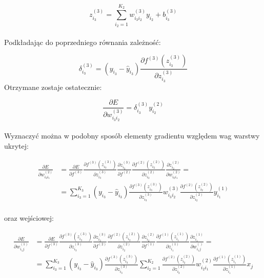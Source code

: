 \documentclass[a4paper, 12pt]{article}
\begin{document}
\begin{equation}
z_{i_{3}}^{(3)} = \sum_{i_2=1}^{K_2} w^{(3)}_{i_3 i_2}y_{i_2} + b^{(3)}_{i_3}
\label{Eq:2.29}
\end{equation}\\
Podkładając do poprzedniego równania zależność:

\begin{equation}
\delta^{(3)}_{i_3} = ( y_{i_3}-\hat{y}_{i_3} ) \frac{\partial f^{(3)}\left(z_{i_3}^{(3)}\right)}{\partial z_{i_{3}}^{(3)}}
\label{Eq:2.30}
\end{equation}
Otrzymane zostaje ostatecznie:

\begin{equation}
\frac{\partial E}{\partial w_{i_{3} i_{2}}^{(3)}} = \delta^{(3)}_{i_3} y^{(2)}_{i_2}
\label{Eq:2.31}
\end{equation}\\
Wyznaczyć można w podobny sposób elementy gradientu względem wag warstwy ukrytej:

\begin{equation}
	\begin{aligned}
\frac{\partial E}{\partial w_{i_{2} i_{1}}^{(2)}} & =\frac{\partial E}{\partial f^{(3)}} \frac{\partial f^{(3)}\left(z_{i_{3}}^{(3)}\right)}{\partial z_{i_{3}}^{(3)}} \frac{\partial z_{i_{3}}^{(3)}}{\partial f^{(2)}} \frac{\partial f^{(2)}\left(z_{i_{2}}^{(2)}\right)}{\partial z_{i_{2}}^{(2)}} \frac{\partial z_{i_{2}}^{(2)}}{\partial w_{i_{2} i_{1}}^{(2)}} =\\
&=\sum_{i_{3}=1}^{K_{3}}\left(y_{i_{3}}-\hat{y}_{i_{3}}\right) \frac{\partial f^{(3)}\left(z_{i_{3}}^{(3)}\right)}{\partial z_{i_{3}}^{(3)}} w_{i_{3} i_{2}}^{(3)} \frac{\partial f^{(2)}\left(z_{i_{2}}^{(2)}\right)}{\partial z_{i_{2}}^{(2)}} y_{i_{1}}^{(1)}
	\end{aligned}
\end{equation}\\
oraz wejściowej:

\begin{equation}
	\begin{aligned}
\frac{\partial E}{\partial w_{i_{1} j}^{(1)}} & =\frac{\partial E}{\partial f^{(3)}} \frac{\partial f^{(3)}\left(z_{i_{3}}^{(3)}\right)}{\partial z_{i_{3}}^{(3)}} \frac{\partial z_{i_{3}}^{(3)}}{\partial f^{(2)}} \frac{\partial f^{(2)}\left(z_{i_{2}}^{(2)}\right)}{\partial z_{i_{2}}^{(2)}} \frac{\partial z_{i_{2}}^{(2)}}{\partial f^{(1)}}\frac{\partial f^{(1)}\left(z_{i_{1}}^{(1)}\right)}{\partial z_{i_{1}}^{(1)}} \frac{\partial z_{i_{1}}^{(1)}}{\partial w_{i_{1} j}^{()}}= \\
 & =\sum_{i_{3}=1}^{K_{3}}\left(y_{i_{3}}-\hat{y}_{i_{3}}\right) \frac{\partial f^{(3)}\left(z_{i_{3}}^{(3)}\right)}{\partial z_{i_{3}}^{(3)}} \sum_{i_{2}=1}^{K_{2}} \frac{\partial f^{(2)}\left(z_{i_{2}}^{(2)}\right)}{\partial z_{i_{2}}^{(2)}} w_{i_{2} i_{1}}^{(2)} \frac{\partial f^{(1)}\left(z_{i_{1}}^{(1)}\right)}{\partial z_{i_{1}}^{(1)}} x_j
	\end{aligned}
\end{equation}\\
\end{document}
